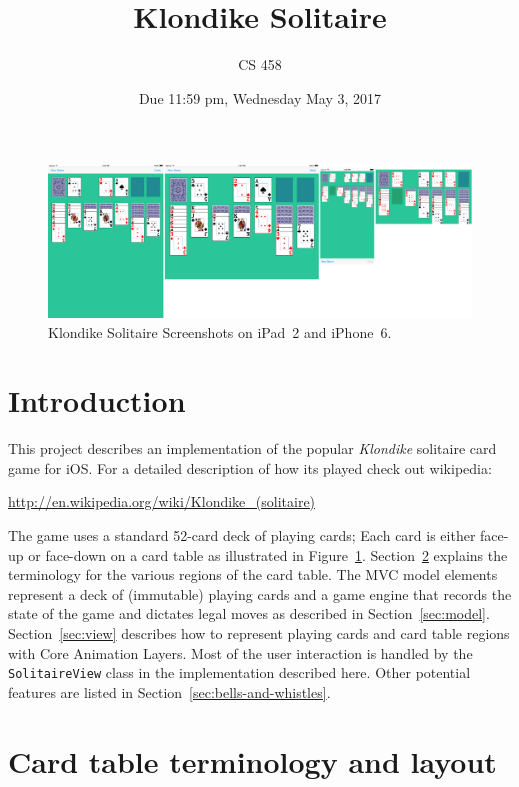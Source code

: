 \documentclass[11pt]{article}
\title{Klondike Solitaire}
\author{CS 458}
\date{Due 11:59 pm, Wednesday May 3, 2017}
\begin{document}
\maketitle


\begin{figure}[ht!] %
   \centering
   \includegraphics[width=\textwidth]{screenshots}
  \caption{Klondike Solitaire Screenshots on iPad~2 and iPhone~6.}
   \label{fig:screenshot}
\end{figure}

\section{Introduction}

This project describes an implementation of the popular 
{\em Klondike} solitaire card game for iOS.
For a detailed description of how its played check out wikipedia:
\begin{flushleft}
\url{http://en.wikipedia.org/wiki/Klondike_(solitaire)}
\end{flushleft}

The game uses a standard 52-card deck of playing cards;
Each card is either face-up or face-down on a card table 
as illustrated in Figure~\ref{fig:screenshot}.
Section~\ref{sec:terms} explains the terminology for the
various regions of the card table. The MVC model elements represent
a deck of (immutable) playing cards and a game engine that records
the state of the game and dictates legal moves as
described in Section~\ref{sec:model}.
Section~\ref{sec:view} describes how to represent playing cards
and card table regions with Core Animation Layers.
Most of the user interaction is handled by the {\tt SolitaireView}
class in the implementation described here.
Other potential features are listed in Section~\ref{sec:bells-and-whistles}.

\pagebreak

\section{Card table terminology and layout} \label{sec:terms}
\end{document}
